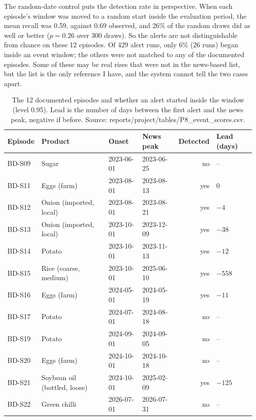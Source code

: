 \documentclass[12pt]{report}
\begin{document}
The random-date control puts the detection rate in perspective. When each episode's window was moved to a random start inside the evaluation period, the mean recall was 0.59, against 0.69 observed, and 26\% of the random draws did as well or better ($p=0.26$ over 300 draws). So the alerts are not distinguishable from chance on these 12 episodes. Of 429 alert runs, only 6\% (26 runs) began inside an event window; the others were not matched to any of the documented episodes. Some of these may be real rises that were not in the news-based list, but the list is the only reference I have, and the system cannot tell the two cases apart.

\begin{table}[H]\centering\small
\caption{The 12 documented episodes and whether an alert started inside the window (level 0.95). Lead is the number of days between the first alert and the news peak, negative if before. Source: reports/project/tables/P8\_event\_scores.csv.}\label{tab:events}
\begin{tabular}{llllrl}
\toprule
Episode & Product & Onset & News peak & Detected & Lead (days) \\
\midrule
BD-S09 & Sugar & 2023-06-01 & 2023-06-25 & no & -- \\
BD-S11 & Eggs (farm) & 2023-08-01 & 2023-08-13 & yes & 0 \\
BD-S12 & Onion (imported, local) & 2023-08-01 & 2023-08-21 & yes & $-4$ \\
BD-S13 & Onion (imported, local) & 2023-10-01 & 2023-12-09 & yes & $-38$ \\
BD-S14 & Potato & 2023-10-01 & 2023-11-13 & yes & $-12$ \\
BD-S15 & Rice (coarse, medium) & 2023-10-01 & 2025-06-10 & yes & $-558$ \\
BD-S16 & Eggs (farm) & 2024-05-01 & 2024-05-19 & yes & $-11$ \\
BD-S17 & Potato & 2024-07-01 & 2024-08-18 & no & -- \\
BD-S19 & Potato & 2024-09-01 & 2024-09-05 & no & -- \\
BD-S20 & Eggs (farm) & 2024-10-01 & 2024-10-18 & no & -- \\
BD-S21 & Soybean oil (bottled, loose) & 2024-10-01 & 2025-02-09 & yes & $-125$ \\
BD-S22 & Green chilli & 2026-07-01 & 2026-07-31 & no & -- \\
\bottomrule
\end{tabular}
\end{table}
\end{document}
